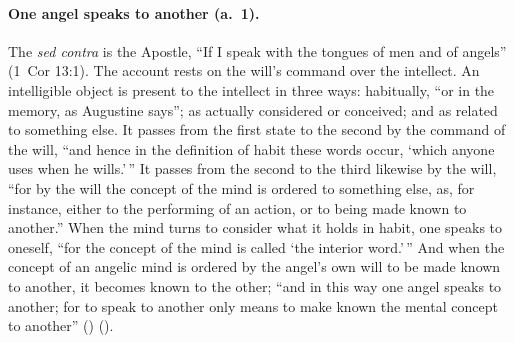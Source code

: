 \paragraph{One angel speaks to another (a.~1).} The \emph{sed contra} is
the Apostle, ``If I speak with the tongues of men and of angels'' (1~Cor
13:1). The account rests on the will's command over the intellect. An
intelligible object is present to the intellect in three ways: habitually,
``or in the memory, as Augustine says''; as actually considered or
conceived; and as related to something else. It passes from the first state
to the second by the command of the will, ``and hence in the definition of
habit these words occur, `which anyone uses when he wills.'\,'' It passes from
the second to the third likewise by the will, ``for by the will the concept
of the mind is ordered to something else, as, for instance, either to the
performing of an action, or to being made known to another.'' When the mind
turns to consider what it holds in habit, one speaks to oneself, ``for the
concept of the mind is called `the interior word.'\,'' And when the concept of
an angelic mind is ordered by the angel's own will to be made known to
another, it becomes known to the other; ``and in this way one angel speaks
to another; for to speak to another only means to make known the mental
concept to another'' () ().

